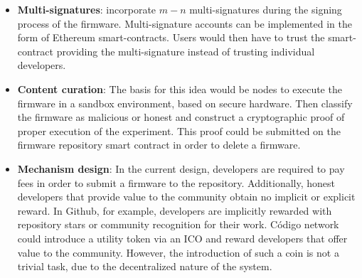 {{\begin{itemize}
    \item \textbf{Multi-signatures}: incorporate $m-n$ multi-signatures during the signing process of the firmware. Multi-signature accounts can be implemented in the form of Ethereum smart-contracts. Users would then have to trust the smart-contract providing the multi-signature instead of trusting individual developers.
    \item \textbf{Content curation}: The basis for this idea would be nodes to execute the firmware in a sandbox environment, based on secure hardware. Then classify the firmware as malicious or honest and construct a cryptographic proof of proper execution of the experiment. This proof could be submitted on the firmware repository smart contract in order to delete a firmware.
    \item \textbf{Mechanism design}: In the current design, developers are required to pay fees in order to submit a firmware to the repository. Additionally, honest developers that provide value to the community obtain no implicit or explicit reward. In Github, for example, developers are implicitly rewarded with repository stars or community recognition for their work. Código network could introduce a utility token via an ICO and reward developers that offer value to the community. However, the introduction of such a coin is not a trivial task, due to  the decentralized nature of the system.
\end{itemize}


}
}